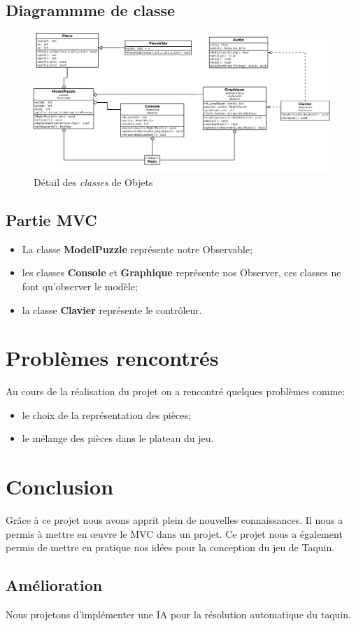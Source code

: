 \documentclass{report}
\begin{document}
		\subsection{Diagrammme de classe}
\begin{figure}[ht]
  \includegraphics[scale=0.3]{images/diagramme}
  \caption{Détail des \emph{classes} de Objets}
  \label{fig:packages}
\end{figure}

	\subsection{Partie MVC}
		\begin{itemize} 
		

			\item La classe \textbf{ModelPuzzle} représente notre Observable;
			\item les classes \textbf{Console} et \textbf{Graphique} représente nos Observer, ces classes ne font qu'observer le modèle;
			\item la classe \textbf{Clavier} représente le contrôleur. 
					
		\end{itemize}
		
	
	\section{Problèmes rencontrés}
		Au cours de la réalisation du projet on a rencontré quelques problèmes comme:
		\begin{itemize}
			\item le choix de la représentation des pièces;
			\item le mélange des pièces dans le plateau du jeu. 
		\end{itemize}
		 
				 
	\section{Conclusion}
			Grâce à ce projet nous avons apprit plein de nouvelles connaissances. Il nous a permis à mettre en œuvre le MVC dans un projet. Ce projet nous a également permis de mettre en pratique nos idées pour la conception du jeu de Taquin. 
			
			\subsection{Amélioration}
				Nous projetons d’implémenter une IA pour la résolution automatique du taquin. 
		
	
\end{document}
